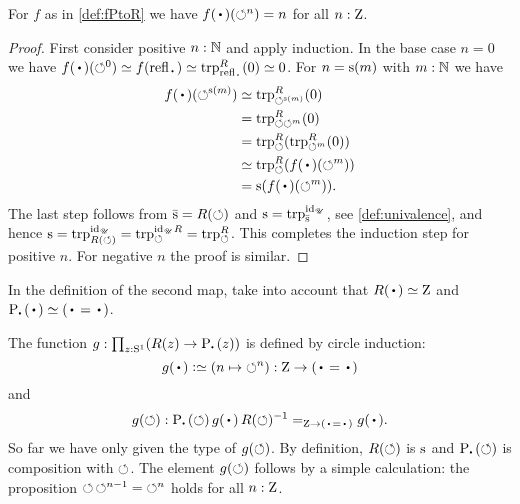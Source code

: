 \begin{lemma}\label{lem:windingnumber}
For $f$ as in \cref{def:fPtoR} we have $f(\base)(\Sloop^n)=n$ for all $n:\mathrm{Z}$.
\end{lemma}
\begin{proof}
First consider positive $n:\mathbb{N}$ and apply induction. In the base case $n=0$ we have
$f(\base)(\Sloop^0)\jdeq f(\refl\base)\jdeq\trp[R]{\refl\base}(0) \jdeq 0$.
For $n=\zs(m)$ with $m:\mathbb{N}$ we have
\begin{align*}
  f(\base)(\Sloop^{\zs(m)})
  &\jdeq\trp[R]{\Sloop^{\zs(m)}}(0)\\
  &=\trp[R]{\Sloop \Sloop^{m}}(0)\\
  &=\trp[R]{\Sloop}(\trp[R]{\Sloop^m}(0))\\
  &\jdeq \trp[R]{\Sloop}(f(\base)(\Sloop^{m}))\\
  &= \zs(f(\base)(\Sloop^{m})).
\end{align*}
The last step follows from $\etop{\zs}=R(\Sloop)$
and $\zs=\trp[\id_\UU]{\etop{\zs}}$, see \cref{def:univalence},
and hence $\zs=\trp[\id_\UU]{R(\Sloop)}=\trp[\id_\UU R]{\Sloop}=\trp[R]{\Sloop}$.
This completes the induction step for positive $n$.
For negative $n$ the proof is similar.
\end{proof}

In the definition of the second map,
take into account that $R(\base)\jdeq \zet$ and $\uc{\base}(\base) \jdeq (\base=\base)$.

\begin{definition}\label{def:gRtoP}
The function $g:\prod_{z:\Sc}(R(z)\to \uc{\base}(z))$ is
defined by circle induction:
\[
g(\base)\defeq \left(n \mapsto {\Sloop^n} \right) :\zet\to(\base=\base)
\]
and
\[
g(\Sloop): \uc{\base}(\Sloop)\, g(\base)\,R(\Sloop)^{-1}=_{\zet\to (\base=\base)} g(\base).
\]
%
So far we have only given the type of $g(\circlearrowleft)$. By definition,
$R(\circlearrowleft)$ is $\zs$ and $\uc{\base}(\Sloop)$ is composition with
$\circlearrowleft$.%
The element $g(\circlearrowleft)$ follows by a simple calculation: the
proposition ${\circlearrowleft\,\circlearrowleft^{n-1}} = {\circlearrowleft^n}$ holds for all
$n:\mathrm{Z}$.
\end{definition}


